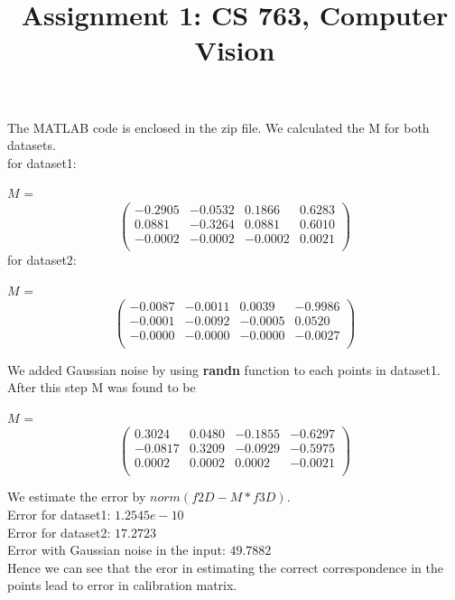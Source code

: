 \documentclass[a4paper,10pt]{article}
\title{Assignment 1: CS 763, Computer Vision}
\author{}
\begin{document}
\maketitle

\section{}
The MATLAB code is enclosed in the zip file.
We calculated the M for both datasets.
\\for dataset1:

$M$ = \[ \left( \begin{array}{cccc}
		-0.2905 & -0.0532 & 0.1866 & 0.6283\\
		0.0881 & -0.3264 & 0.0881 & 0.6010\\
		-0.0002 & -0.0002 & -0.0002 & 0.0021\\
              \end{array} \right)\] 
for dataset2:

$M$ = \[ \left( \begin{array}{cccc}
		-0.0087 & -0.0011  & 0.0039 & -0.9986\\
		-0.0001 & -0.0092 & -0.0005 &  0.0520\\
		-0.0000 & -0.0000 & -0.0000 & -0.0027\\
              \end{array} \right)\]

We added Gaussian noise by using \textbf{randn} function to each points in dataset1. After this step M was found to be

$M$ = \[ \left( \begin{array}{cccc}
    0.3024  & 0.0480 & -0.1855 & -0.6297\\
   -0.0817  & 0.3209 & -0.0929 & -0.5975\\
    0.0002  & 0.0002 &  0.0002 & -0.0021\\
              \end{array} \right)\]
              
We estimate the error by $norm(f2D - M*f3D)$. 
\\Error for dataset1: $1.2545e-10$
\\Error for dataset2: $17.2723$
\\Error with Gaussian noise in the input: $49.7882$
\\
              
Hence we can see that the eror in estimating the correct correspondence in the points lead to error in 
calibration matrix.\\
\\
\end{document}
